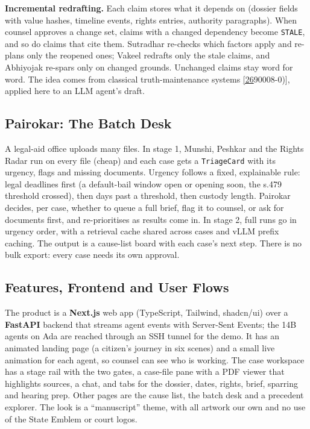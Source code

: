 \documentclass[10pt,a4paper]{article}
\newcommand{\st}[1]{\texttt{\small #1}}
\begin{document}
\textbf{Incremental redrafting.} Each claim stores what it depends on (dossier fields with value hashes, timeline events, rights entries, authority paragraphs). When counsel approves a change set, claims with a changed dependency become \st{STALE}, and so do claims that cite them. Sutradhar re-checks which factors apply and re-plans only the reopened ones; Vakeel redrafts only the stale claims, and Abhiyojak re-spars only on changed grounds. Unchanged claims stay word for word. The idea comes from classical truth-maintenance systems \href{https://doi.org/10.1016/0004-3702(79}{[26}90008-0)], applied here to an LLM agent's draft.

\subsection{Pairokar: The Batch Desk}

A legal-aid office uploads many files. In stage 1, Munshi, Peshkar and the Rights Radar run on every file (cheap) and each case gets a \st{TriageCard} with its urgency, flags and missing documents. Urgency follows a fixed, explainable rule: legal deadlines first (a default-bail window open or opening soon, the s.479 threshold crossed), then days past a threshold, then custody length. Pairokar decides, per case, whether to queue a full brief, flag it to counsel, or ask for documents first, and re-prioritises as results come in. In stage 2, full runs go in urgency order, with a retrieval cache shared across cases and vLLM prefix caching. The output is a cause-list board with each case's next step. There is no bulk export: every case needs its own approval.

\subsection{Features, Frontend and User Flows}

The product is a \textbf{Next.js} web app (TypeScript, Tailwind, shadcn/ui) over a \textbf{FastAPI} backend that streams agent events with Server-Sent Events; the 14B agents on Ada are reached through an SSH tunnel for the demo. It has an animated landing page (a citizen's journey in six scenes) and a small live animation for each agent, so counsel can see who is working. The case workspace has a stage rail with the two gates, a case-file pane with a PDF viewer that highlights sources, a chat, and tabs for the dossier, dates, rights, brief, sparring and hearing prep. Other pages are the cause list, the batch desk and a precedent explorer. The look is a ``manuscript'' theme, with all artwork our own and no use of the State Emblem or court logos.
\end{document}

